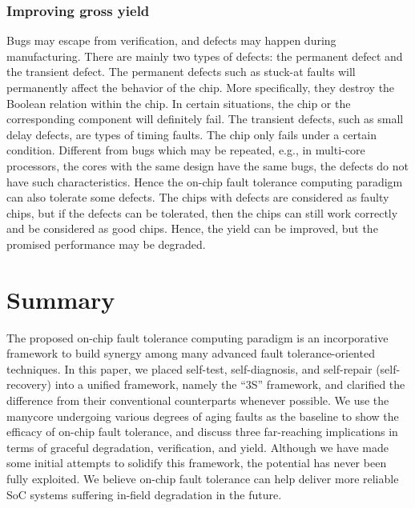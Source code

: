 \subsubsection{Improving gross yield}
Bugs may escape from verification, and defects may happen during manufacturing. There are mainly two types of defects: the permanent defect and the transient defect. The permanent defects such as stuck-at faults will permanently affect the behavior of the chip. More specifically, they destroy the Boolean relation within the chip. In certain situations, the chip or the corresponding component will definitely fail. The transient defects, such as small delay defects, are types of timing faults. The chip only fails under a certain condition. Different from bugs which may be repeated, e.g., in multi-core processors, the cores with the same design have the same bugs, the defects do not have such characteristics. Hence the on-chip fault tolerance computing paradigm can also tolerate some defects. The chips with defects are considered as faulty chips, but if the defects can be tolerated, then the chips can still work correctly and be considered as good chips. Hence, the yield can be improved, but the promised performance may be degraded.

\section{Summary}
The proposed on-chip fault tolerance computing paradigm is an incorporative framework to build synergy among many advanced fault tolerance-oriented techniques. In this paper, we placed self-test, self-diagnosis, and self-repair (self-recovery) into a unified framework, namely the “3S” framework, and clarified the difference from their conventional counterparts whenever possible. We use the manycore undergoing various degrees of aging faults as the baseline to show the efficacy of on-chip fault tolerance, and discuss three far-reaching implications in terms of graceful degradation, verification, and yield. Although we have made some initial attempts to solidify this framework, the potential has never been fully exploited. We believe on-chip fault tolerance can help deliver more reliable SoC systems suffering in-field degradation in the future.





